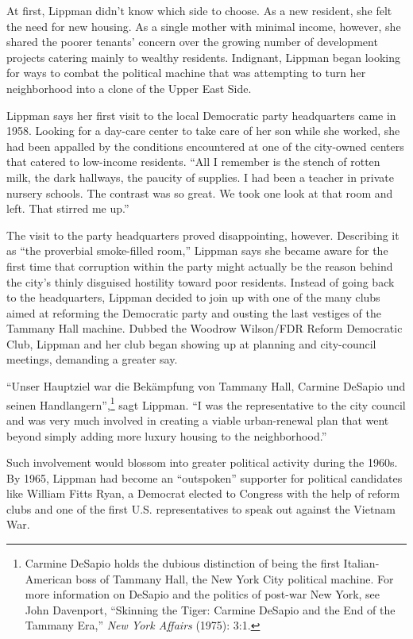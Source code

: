 {At first, Lippman didn't know which side to choose. As a new resident, she felt the need for new housing. As a single mother with minimal income, however, she shared the poorer tenants' concern over the growing number of development projects catering mainly to wealthy residents. Indignant, Lippman began looking for ways to combat the political machine that was attempting to turn her neighborhood into a clone of the Upper East Side.

Lippman says her first visit to the local Democratic party headquarters came in 1958. Looking for a day-care center to take care of her son while she worked, she had been appalled by the conditions encountered at one of the city-owned centers that catered to low-income residents. "`All I remember is the stench of rotten milk, the dark hallways, the paucity of supplies. I had been a teacher in private nursery schools. The contrast was so great. We took one look at that room and left. That stirred me up."'

The visit to the party headquarters proved disappointing, however. Describing it as "`the proverbial smoke-filled room,"' Lippman says she became aware for the first time that corruption within the party might actually be the reason behind the city's thinly disguised hostility toward poor residents. Instead of going back to the headquarters, Lippman decided to join up with one of the many clubs aimed at reforming the Democratic party and ousting the last vestiges of the Tammany Hall machine. Dubbed the Woodrow Wilson/FDR Reform Democratic Club, Lippman and her club began showing up at planning and city-council meetings, demanding a greater say.

"`Unser Hauptziel war die Bekämpfung von Tammany Hall, Carmine DeSapio und seinen Handlangern"',\footnote{Carmine DeSapio holds the dubious distinction of being the first Italian-American boss of Tammany Hall, the New York City political machine. For more information on DeSapio and the politics of post-war New York, see John Davenport, "`Skinning the Tiger: Carmine DeSapio and the End of the Tammany Era,"' \textit{New York Affairs} (1975): 3:1.} sagt Lippman. "`I was the representative to the city council and was very much involved in creating a viable urban-renewal plan that went beyond simply adding more luxury housing to the neighborhood."'

Such involvement would blossom into greater political activity during the 1960s. By 1965, Lippman had become an "`outspoken"' supporter for political candidates like William Fitts Ryan, a Democrat elected to Congress with the help of reform clubs and one of the first U.S. representatives to speak out against the Vietnam War.

}
